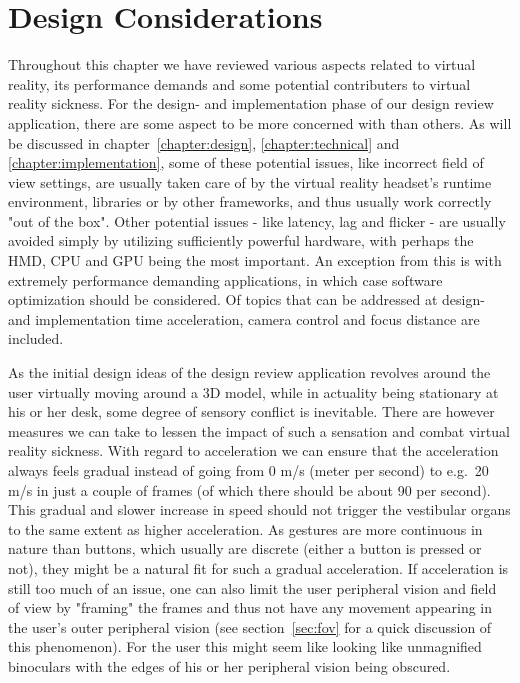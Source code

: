 \section{Design Considerations}
Throughout this chapter we have reviewed various aspects related to virtual reality, its performance demands and some potential contributers to virtual reality sickness. 
For the design- and implementation phase of our design review application, there are some aspect to be more concerned with than others. As will be discussed in chapter~\ref{chapter:design}, 
\ref{chapter:technical} and \ref{chapter:implementation}, some of these potential issues, like incorrect field of view settings, are usually taken care of by the 
virtual reality headset's runtime environment, libraries or by other frameworks, and thus usually work correctly "out of the box". 
Other potential issues - like latency, lag and flicker - are usually avoided simply by utilizing sufficiently powerful hardware, with perhaps the HMD, CPU and GPU 
being the most important. An exception from this is with extremely performance demanding applications, in which case software optimization should be considered.
Of topics that can be addressed at design- and implementation time acceleration, camera control and focus distance are included.  

As the initial design ideas of the design review application revolves around the user virtually moving around a 3D model, while in actuality being stationary at his or her
desk, some degree of sensory conflict is inevitable. There are however measures we can take to lessen the impact of such a sensation and combat virtual reality sickness.
With regard to acceleration we can ensure that the acceleration always feels gradual instead of going from 0 m/s (meter per second) to e.g.~20 m/s in just a couple of frames 
(of which there should be about 90 per second). This gradual and slower increase in speed should not trigger the vestibular organs to the same extent as higher acceleration.
As gestures are more continuous in nature than buttons, which usually are discrete (either a button is pressed or not), they might be a natural fit for such a gradual acceleration. 
If acceleration is still too much of an issue, one can also limit the user peripheral vision and field of view by "framing" the frames
and thus not have any movement appearing in the user's outer peripheral vision (see section~\vref{sec:fov} for a quick discussion of this phenomenon).
For the user this might seem like looking like unmagnified binoculars with the edges of his or her peripheral vision being obscured.  

